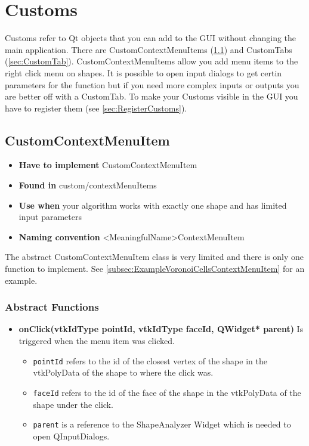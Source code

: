 
\chapter{Customs}
\label{chap:Customs}

Customs refer to Qt objects that you can add to the GUI without changing the main application. There are CustomContextMenuItems (\ref{sec:CustomContextMenuItem}) and CustomTabs (\ref{sec:CustomTab}). CustomContextMenuItems allow you add menu items to the right click menu on shapes. It is possible to open input dialogs to get certin parameters for the function but if you need more complex inputs or outputs you are better off with a CustomTab. To make your Customs visible in the GUI you have to register them (see \ref{sec:RegisterCustoms}).

\section{CustomContextMenuItem}
\label{sec:CustomContextMenuItem}

\begin{itemize}
	\item \textbf{Have to implement} CustomContextMenuItem
	\item \textbf{Found in} custom/contextMenuItems
	\item \textbf{Use when} your algorithm works with exactly one shape and has limited input parameters
	\item\textbf{Naming convention} <MeaningfulName>ContextMenuItem
\end{itemize}

The abstract CustomContextMenuItem class is very limited and there is only one function to implement. See \ref{subsec:ExampleVoronoiCellsContextMenuItem} for an example. 

\subsection{Abstract Functions}

\begin{itemize}
	\item \textbf{onClick(vtkIdType pointId, vtkIdType faceId, QWidget* parent)} Is triggered when the menu item was clicked. 
	\begin{itemize}
		\item \texttt{pointId} refers to the id of the closest vertex of the shape in the vtkPolyData of the shape to where the click was. 
		\item \texttt{faceId} refers to the id of the face of the shape in the vtkPolyData of the shape under the click. 
		\item \texttt{parent} is a reference to the ShapeAnalyzer Widget which is needed to open QInputDialogs.
	\end{itemize}
\end{itemize}

